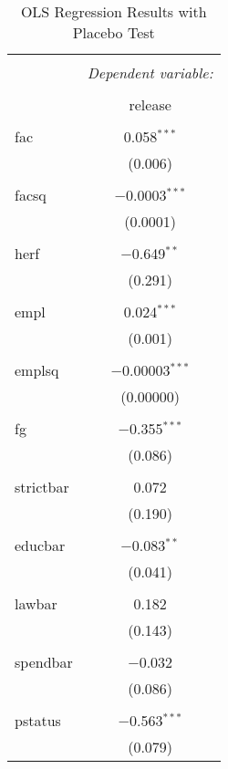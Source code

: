 
\begin{table}[!htbp] \centering 
  \caption{OLS Regression Results with Placebo Test} 
  \label{} 
\begin{tabular}{@{\extracolsep{5pt}}lc} 
\\[-1.8ex]\hline 
\hline \\[-1.8ex] 
 & \multicolumn{1}{c}{\textit{Dependent variable:}} \\ 
\cline{2-2} 
\\[-1.8ex] & release \\ 
\hline \\[-1.8ex] 
 fac & 0.058$^{***}$ \\ 
  & (0.006) \\ 
  & \\ 
 facsq & $-$0.0003$^{***}$ \\ 
  & (0.0001) \\ 
  & \\ 
 herf & $-$0.649$^{**}$ \\ 
  & (0.291) \\ 
  & \\ 
 empl & 0.024$^{***}$ \\ 
  & (0.001) \\ 
  & \\ 
 emplsq & $-$0.00003$^{***}$ \\ 
  & (0.00000) \\ 
  & \\ 
 fg & $-$0.355$^{***}$ \\ 
  & (0.086) \\ 
  & \\ 
 strictbar & 0.072 \\ 
  & (0.190) \\ 
  & \\ 
 educbar & $-$0.083$^{**}$ \\ 
  & (0.041) \\ 
  & \\ 
 lawbar & 0.182 \\ 
  & (0.143) \\ 
  & \\ 
 spendbar & $-$0.032 \\ 
  & (0.086) \\ 
  & \\ 
 pstatus & $-$0.563$^{***}$ \\ 
  & (0.079) \\ 

\end{tabular}
\end{table}

